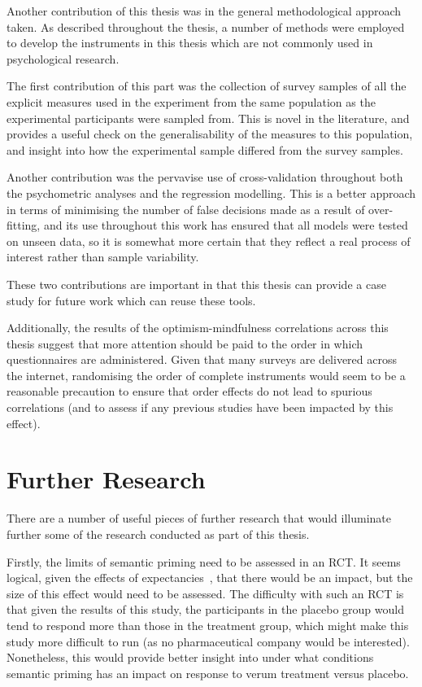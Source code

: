 Another contribution of this thesis was in the general methodological approach taken. 
As described throughout the thesis, a number of methods were employed to develop the instruments 
in this thesis which are not commonly used in psychological research.

The first contribution of this part was the collection of survey samples of all the explicit
measures used in the experiment from the same population as the experimental participants were sampled from. This is novel in the literature, and provides a useful check on the generalisability of the measures to this population, and insight into how the experimental sample differed from the survey samples. 

Another contribution was the pervavise use of cross-validation throughout both the psychometric analyses and the regression modelling. This is a better approach in terms of minimising the number of false decisions made as a result of over-fitting, and its use throughout this work has ensured that all models were tested on unseen data, so it is somewhat more certain that they reflect a real process of interest rather than sample variability. 

These two contributions are important in that this thesis can provide a case study for future work which can reuse these tools. 

Additionally, the results of the optimism-mindfulness correlations across this thesis suggest that more attention should be paid to the order in which questionnaires are administered. Given that many surveys are delivered across the internet, randomising the order of complete instruments would seem to be a reasonable precaution to ensure that order effects do not lead to spurious correlations (and to assess if any previous studies have been impacted by this effect). 

\section{Further Research}
\label{sec:further-research}

There are a number of useful pieces of further research that would illuminate further some of the research conducted as part of this thesis. 

Firstly, the limits of semantic priming need to be assessed in an RCT. It seems logical, given the effects of expectancies~\cite{Bausell2005}, that there would be an impact, but the size of this effect would need to be assessed. The difficulty with such an RCT is that given the results of this study, the participants in the placebo group would tend to respond more than those in the treatment group, which might make this study more difficult to run (as no pharmaceutical company would be interested). Nonetheless, this would provide better insight into under what conditions semantic priming has an impact on response to verum treatment versus placebo. 

